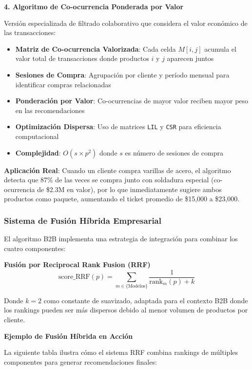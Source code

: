 \documentclass[twocolumn]{article}
\begin{document}
\textbf{4. Algoritmo de Co-ocurrencia Ponderada por Valor}

Versión especializada de filtrado colaborativo que considera el valor económico de las transacciones:

\begin{itemize}
    \item \textbf{Matriz de Co-ocurrencia Valorizada}: Cada celda \(M[i,j]\) acumula el valor total de transacciones donde productos \(i\) y \(j\) aparecen juntos
    \item \textbf{Sesiones de Compra}: Agrupación por cliente y período mensual para identificar compras relacionadas
    \item \textbf{Ponderación por Valor}: Co-ocurrencias de mayor valor reciben mayor peso en las recomendaciones
    \item \textbf{Optimización Dispersa}: Uso de matrices \texttt{LIL} y \texttt{CSR} para eficiencia computacional
    \item \textbf{Complejidad}: \(O(s \times p^2)\) donde \(s\) es número de sesiones de compra
\end{itemize}

\textbf{Aplicación Real}: Cuando un cliente compra varillas de acero, el algoritmo detecta que 87\% de las veces se compra junto con soldadura especial (co-ocurrencia de \$2.3M en valor), por lo que inmediatamente sugiere ambos productos como paquete, aumentando el ticket promedio de \$15,000 a \$23,000.

\subsubsection{Sistema de Fusión Híbrida Empresarial}

El algoritmo B2B implementa una estrategia de integración para combinar los cuatro componentes:




\textbf{Fusión por Reciprocal Rank Fusion (RRF)}
\begin{equation}
\text{score\_RRF}(p) = \sum_{m \in \{\text{Modelos}\}} \frac{1}{\text{rank}_m(p) + k}
\end{equation}

Donde \(k = 2\) como constante de suavizado, adaptada para el contexto B2B donde los rankings pueden ser más dispersos debido al menor volumen de productos por cliente.

\textbf{Ejemplo de Fusión Híbrida en Acción}

La siguiente tabla ilustra cómo el sistema RRF combina rankings de múltiples componentes para generar recomendaciones finales:
\end{document}
